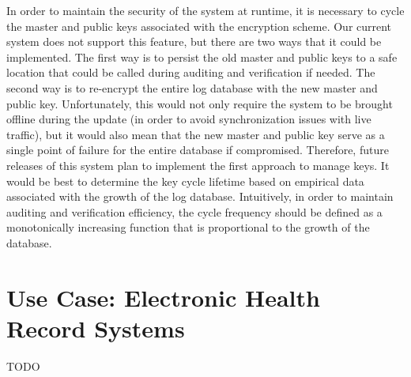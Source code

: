 \documentclass{sig-alternate}
\begin{document}
In order to maintain the security of the system at runtime, it is necessary to cycle the master and public keys
associated with the encryption scheme. Our current system does not support this feature, but there are two
ways that it could be implemented. The first way is to persist the old master and 
public keys to a safe location that could be called during auditing and verification if needed. The second way is 
to re-encrypt the entire log database with the new master and public key. Unfortunately, this would not only require the system to be 
brought offline during the update (in order to avoid synchronization issues with live traffic), but it would also
mean that the new master and public key serve as a single point of failure for the entire database if compromised. 
Therefore, future releases of this system plan to implement the first approach to manage keys. It would be
best to determine the key cycle lifetime based on empirical data associated with the growth of the log database.
Intuitively, in order to maintain auditing and verification efficiency, the cycle frequency should be defined as 
a monotonically increasing function that is proportional to the growth of the database. 

\section{Use Case: Electronic Health Record Systems}
TODO

\balance
\end{document}

